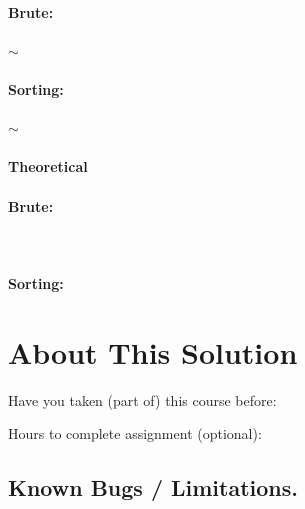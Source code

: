 \documentclass[11pt,a4paper,notitlepage]{article}
\newcommand{\explanation}[1]{}  %
\begin{document}
\explanation{
 Estimate (using tilde notation) the running time (in seconds) of
 your two main functions as a function of the number of points N.
% 
  Explain how you derive any exponents.}

\paragraph{Brute:} \quad $\sim $
\bigskip

\paragraph{Sorting:} $\sim$


\paragraph{Theoretical}
\explanation{Give the order of growth of the worst-case running
                 time of your programs as a function of N. Justify
                 your answer briefly.}

\paragraph{Brute:} \ 
\bigskip

\paragraph{Sorting:}



\section{About This Solution}

Have you taken (part of) this course before:
\smallskip

Hours to complete assignment (optional):


 
\subsection{Known Bugs / Limitations.}
\explanation{Known bugs / limitations. For example, if your program prints
  out different representations of the same line segment when there
 are 5 or more points on a line segment, indicate that here.}
\end{document}
